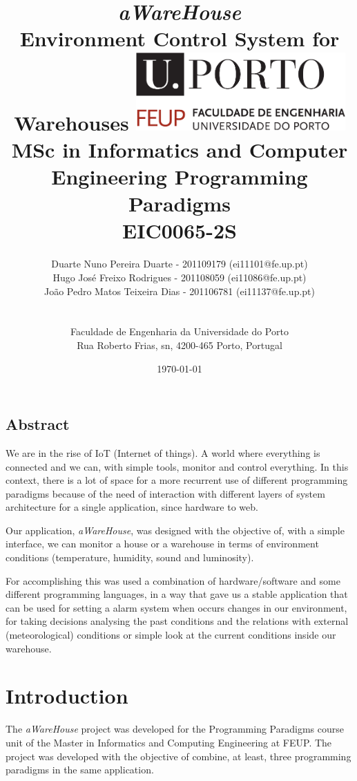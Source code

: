 \documentclass[12pt]{report}
\title{
\huge{\textbf{\textit{aWareHouse}}}\linebreak
\Large\textbf{\\Environment Control System for Warehouses}\linebreak\linebreak\linebreak
\includegraphics[width=8cm]{feup.pdf}\linebreak \linebreak
\large{MSc in Informatics and Computer Engineering} \linebreak
\large{Programming Paradigms \\ EIC0065-2S}\linebreak
}
\author{
Duarte Nuno Pereira Duarte - 201109179 (ei11101@fe.up.pt)\\
Hugo José Freixo Rodrigues - 201108059 (ei11086@fe.up.pt)\\
João Pedro Matos Teixeira Dias - 201106781 (ei11137@fe.up.pt)\\
\\
\\ Faculdade de Engenharia da Universidade do Porto \\ Rua Roberto Frias, s\/n, 4200-465 Porto, Portugal
}
\date{\today}
\begin{document}
\clearpage\maketitle
\thispagestyle{empty}

\newpage
\section*{Abstract}

We are in the rise of IoT (Internet of things). A world where everything is connected and we can, with simple tools, monitor and control everything. In this context, there is a lot of space for a more recurrent use of different programming paradigms because of the need of interaction with different layers of system architecture for a single application, since hardware to web.

Our application, \textit{aWareHouse}, was designed with the objective of, with a simple interface, we can monitor a house or a warehouse in terms of environment conditions (temperature, humidity, sound and luminosity). 

For accomplishing this was used a combination of hardware/software and some different programming languages, in a way that gave us a stable application that can be used for setting a alarm system when occurs changes in our environment, for taking decisions analysing the past conditions and the relations with external (meteorological) conditions or simple look at the current conditions inside our warehouse.


\newpage
\tableofcontents
\newpage

\chapter{Introduction}

The \textit{aWareHouse} project was developed for the Programming Paradigms course unit of the Master in Informatics and Computing Engineering at FEUP. The project was developed with the objective of combine, at least, three programming paradigms in the same application.
\end{document}
